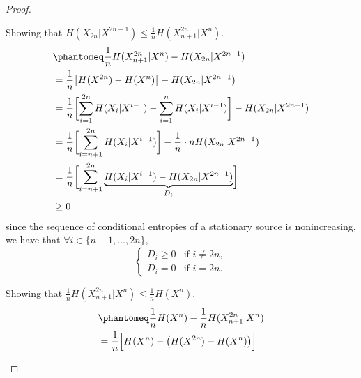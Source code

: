 \documentclass[
  coursecode={MTHE 474},
  assignmentname={Homework \homeworknumber},
  studentnumber=20053722,
  name={Bryan Hoang},
  draft,
]{
  ltxanswer%
}
\begin{document}
\begin{questions}
\begin{parts}
\begin{subparts}
        \subpart{}
        \begin{solution}
          \begin{proof}
            \begin{proofpart} %
              Showing that \(H(X_{2n}|X^{2n-1}) \le \frac{1}{n}H(X_{n+1}^{2n}|X^{n})\).
              \begin{align*}
                 &\phantomeq \frac{1}{n}H(X_{n+1}^{2n}|X^{n}) - H(X_{2n}|X^{2n-1})                                                   \\
                 &= \frac{1}{n}\bigl[H(X^{2n}) - H(X^{n})\bigr] - H(X_{2n}|X^{2n-1})                                                 \\
                 &= \frac{1}{n}\biggl[\sum_{i=1}^{2n} H(X_{i}|X^{i-1}) - \sum_{i=1}^{n} H(X_{i}|X^{i-1})\biggr] - H(X_{2n}|X^{2n-1}) \\
                 &= \frac{1}{n}\biggl[\sum_{i=n+1}^{2n} H(X_{i}|X^{i-1})\biggr] - \frac{1}{n} \cdot n H(X_{2n}|X^{2n-1})             \\
                 &= \frac{1}{n}\biggl[\sum_{i=n+1}^{2n} \underbrace{H(X_{i}|X^{i-1}) - H(X_{2n}|X^{2n-1})}_{D_{i}}\biggr]            \\
                 &\ge 0
              \end{align*}
              since the sequence of conditional entropies of a stationary source is nonincreasing, we have that \(\forall i \in \{n+1,\dotsc,2n\}\),
              \begin{equation*}
                \begin{cases}
                  D_{i} \ge 0 &\text{if } i \neq 2n, \\
                  D_{i} = 0   &\text{if } i = 2n.
                \end{cases}
              \end{equation*}
            \end{proofpart}
            \begin{proofpart} %
              Showing that \(\frac{1}{n}H(X_{n+1}^{2n}|X^{n}) \le \frac{1}{n}H(X^{n})\).
              \begin{align*}
                 &\phantomeq \frac{1}{n}H(X^{n}) - \frac{1}{n}H(X_{n+1}^{2n}|X^{n})                                                                                    \\
                 &= \frac{1}{n} \Bigl[H(X^{n}) - \bigl(H(X^{2n}) - H(X^{n})\bigr) \Bigr]                                                                               \\

\end{align*}
\end{proofpart}
\end{proof}
\end{solution}
\end{subparts}
\end{parts}
\end{questions}
\end{document}
